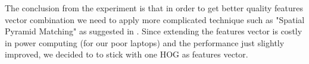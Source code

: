 The conclusion from the experiment is that in order to get better quality features vector combination we need to apply more complicated technique such as "Spatial Pyramid Matching" as suggested in \cite{Spatial_Pyramid}. Since extending the features vector is costly in power computing (for our poor laptops) and the performance just slightly improved, we decided to to stick with one HOG as features vector.